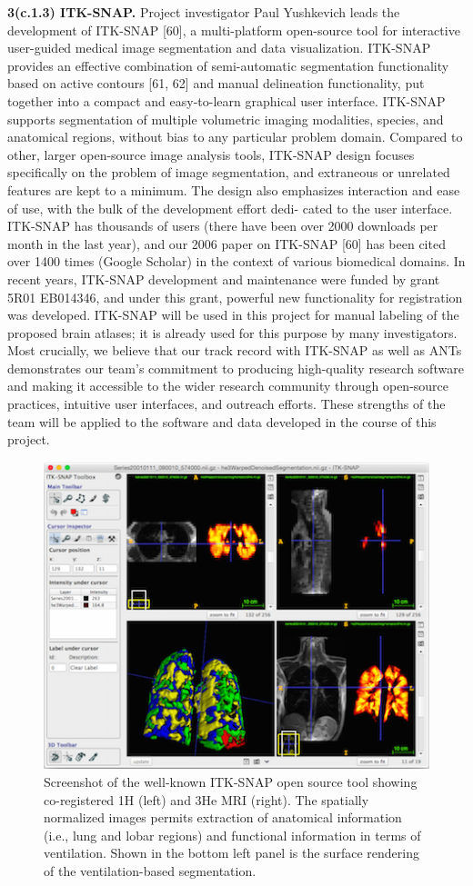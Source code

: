 \documentclass[11pt,]{article}
\begin{document}
\textbf{3(c.1.3) ITK-SNAP.} Project investigator Paul Yushkevich leads
the development of ITK-SNAP {[}60{]}, a multi-platform open-source tool
for interactive user-guided medical image segmentation and data
visualization. ITK-SNAP provides an effective combination of
semi-automatic segmentation functionality based on active contours
{[}61, 62{]} and manual delineation functionality, put together into a
compact and easy-to-learn graphical user interface. ITK-SNAP supports
segmentation of multiple volumetric imaging modalities, species, and
anatomical regions, without bias to any particular problem domain.
Compared to other, larger open-source image analysis tools, ITK-SNAP
design focuses specifically on the problem of image segmentation, and
extraneous or unrelated features are kept to a minimum. The design also
emphasizes interaction and ease of use, with the bulk of the development
effort dedi- cated to the user interface. ITK-SNAP has thousands of
users (there have been over 2000 downloads per month in the last year),
and our 2006 paper on ITK-SNAP {[}60{]} has been cited over 1400 times
(Google Scholar) in the context of various biomedical domains. In recent
years, ITK-SNAP development and maintenance were funded by grant 5R01
EB014346, and under this grant, powerful new functionality for
registration was developed. ITK-SNAP will be used in this project for
manual labeling of the proposed brain atlases; it is already used for
this purpose by many investigators. Most crucially, we believe that our
track record with ITK-SNAP as well as ANTs demonstrates our team's
commitment to producing high-quality research software and making it
accessible to the wider research community through open-source
practices, intuitive user interfaces, and outreach efforts. These
strengths of the team will be applied to the software and data developed
in the course of this project.

\begin{figure}[htbp]
\centering
\includegraphics{Figs/snap.png}
\caption{Screenshot of the well-known ITK-SNAP open source tool showing
co-registered 1H (left) and 3He MRI (right). The spatially normalized
images permits extraction of anatomical information (i.e., lung and
lobar regions) and functional information in terms of ventilation. Shown
in the bottom left panel is the surface rendering of the
ventilation-based segmentation.}
\end{figure}
\end{document}

